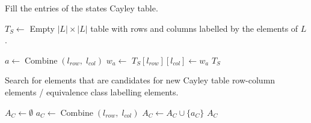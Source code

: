 \begin{algorithm}[H]
	\caption{
		Fill the entries of the states Cayley table.
	}
	\hrulefill
	\begin{algorithmic}[1]
		\State $T_{S} \gets$ Empty $|L| \times |L|$ table with rows and columns labelled by the elements of $L$.

		\State $a \gets \operatorname{Combine}(l_{row}, \; l_{col})$
		\State $w_{a} \gets$ 
		\State $T_{S}[l_{row}][l_{col}] \gets w_{a}$
		\EndFor
		\EndFor
		\State \Return $T_{S}$
		\EndProcedure
	\end{algorithmic}
\end{algorithm}


\begin{algorithm}[H]
	\caption{Search for elements that are candidates for new Cayley table row-column elements / equivalence class labelling elements.}
	\hrulefill
	\begin{algorithmic}[1]
		\State $A_{C} \gets \emptyset$
		\State $a_{C} \gets \operatorname{Combine}(l_{row}, \; l_{col})$
		\Statex {}
		\State $A_{C} \gets A_{C} \cup \{a_{C}\}$
		\EndIf
		\EndFor
		\EndFor
		\State \Return $A_{C}$
		\EndProcedure
	\end{algorithmic}
\end{algorithm}


